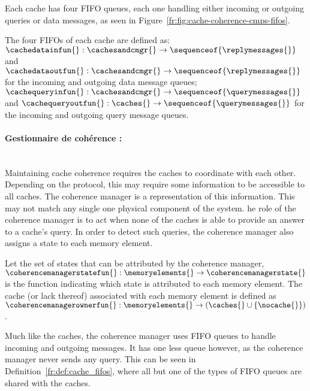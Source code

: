 Each cache has four FIFO queues, each one handling either incoming or outgoing
queries or data messages, as seen in
Figure~\ref{fr:fig:cache-coherence-cmps-fifos}.

\begin{definition}
\label{fr:def:cache_fifos}
The four FIFOs of each cache are defined as:
$\cachedatainfun{} : \cachesandcmgr{} \to \sequenceof{\replymessages{}}$ and
$\cachedataoutfun{} : \cachesandcmgr{} \to \sequenceof{\replymessages{}}$ for the
incoming and outgoing data message queues;
$\cachequeryinfun{} : \cachesandcmgr{} \to \sequenceof{\querymessages{}}$ and
$\cachequeryoutfun{} : \caches{} \to \sequenceof{\querymessages{}}$ for the
incoming and outgoing query message queues.
\end{definition}

\paragraph{Gestionnaire de coh\'erence :}~~\\
Maintaining cache coherence requires the caches to coordinate with each other.
Depending on the protocol, this may require some information to be accessible
to all caches. The coherence manager is a representation of this information.
This may not match any single one physical component of the system.
he role of the coherence manager is to act when none of the caches is
able to provide an answer to a cache's query. In order to detect such queries,
the coherence manager also assigns a state to each memory element.

\begin{definition}
\label{fr:def:cmgr_info}
Let \coherencemanagerstate{} the set of states that can be attributed by the
coherence manager, $\coherencemanagerstatefun{} : \memoryelements{} \to
\coherencemanagerstate{}$ is the function indicating which state is attributed
to each memory element. The cache (or lack thereof) associated with each memory
element is defined as $\coherencemanagerownerfun{} : \memoryelements{} \to
(\caches{} \cup \{\nocache{}\})$.
\end{definition}

Much like the caches, the coherence manager uses FIFO queues to handle incoming
and outgoing messages. It has one less queue however, as the coherence manager
never sends any query. This can be seen in Definition~\ref{fr:def:cache_fifos},
where all but one of the types of FIFO queues are shared with the caches.

